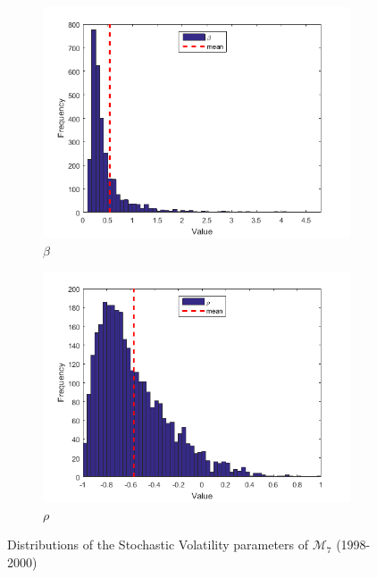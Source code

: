 \documentclass[11pt,a4,twosided,singlespacing,titlepagenumber=on]{scrreprt}
\numberwithin{equation}{chapter} %
\theoremstyle{remark}
\begin{document}
\begin{figure}[H]
\begin{subfigure}[t]{0.32\textwidth}
        \includegraphics[width=1\textwidth]{res/params/2923_3653/5}
        \caption{$\beta$}
    \end{subfigure}
    \begin{subfigure}[t]{0.32\textwidth}
        \centering
        \includegraphics[width=1\textwidth]{res/params/2923_3653/6}
        \caption{$\rho$}
    \end{subfigure}
    \caption[]{Distributions of the Stochastic Volatility parameters of $\mathcal{M}_7$ (1998-2000)}
    \label{fig:param_dists_2000_2002}
\end{figure}
\end{document}
